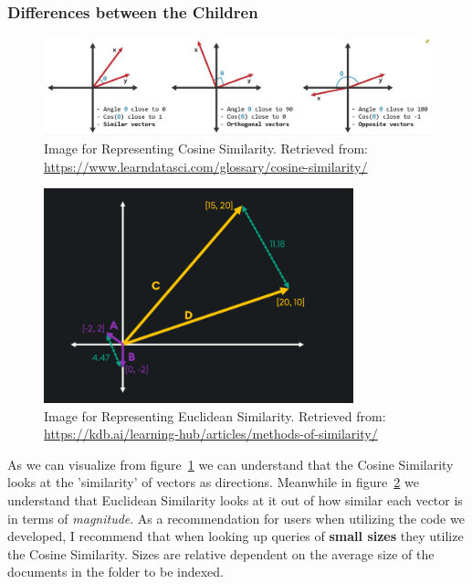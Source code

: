 \documentclass{article}
\begin{document}
\subsubsection{Differences between the Children}
\begin{figure}[H]
    \centering
    \includegraphics[width=\textwidth]{Image_CosineSimilarity.png}
    \caption{Image for Representing Cosine Similarity. Retrieved from: \url{https://www.learndatasci.com/glossary/cosine-similarity/}}
    \label{fig:CosineSimilarity}
\end{figure}
\begin{figure}[H]
    \centering
    \includegraphics[width=0.8\textwidth]{Image_EuclideanSimilarity.png}
    \caption{Image for Representing Euclidean Similarity. Retrieved from: \url{https://kdb.ai/learning-hub/articles/methods-of-similarity/}}
    \label{fig:EuclideanSimilarity}
\end{figure}
As we can visualize from figure~\ref*{fig:CosineSimilarity} we can understand that the Cosine Similarity looks at the 'similarity' of vectors as directions. Meanwhile in figure~\ref*{fig:EuclideanSimilarity} we understand that Euclidean Similarity looks at it out of how similar each vector is in terms of \textit{magnitude}.
\newline
\indent As a recommendation for users when utilizing the code we developed, I recommend that when looking up queries of \textbf{small sizes} they utilize the Cosine Similarity. Sizes are relative dependent on the average size of the documents in the folder to be indexed.
\end{document}
